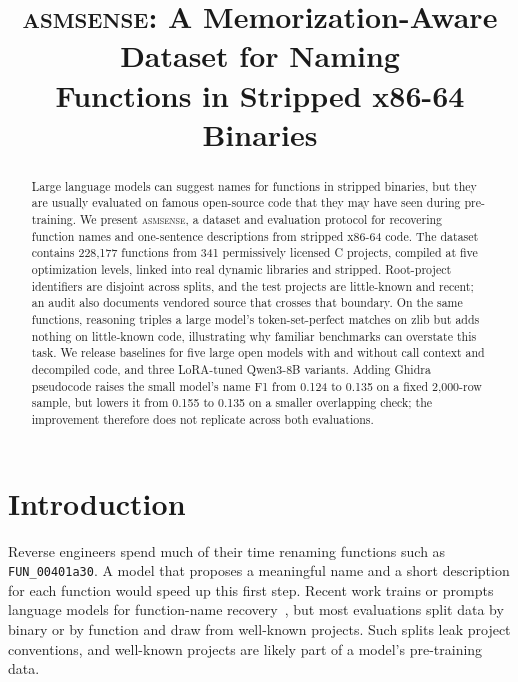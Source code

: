 \documentclass[conference]{IEEEtran}
\newcommand{\tool}{\textsc{asmsense}\xspace}
\begin{document}
\title{\tool: A Memorization-Aware Dataset for Naming\\Functions in Stripped x86-64 Binaries}

\author{
}

\maketitle

\begin{abstract}
Large language models can suggest names for functions in stripped binaries, but they are usually evaluated on famous open-source code that they may have seen during pre-training. We present \tool, a dataset and evaluation protocol for recovering function names and one-sentence descriptions from stripped x86-64 code. The dataset contains 228,177 functions from 341 permissively licensed C projects, compiled at five optimization levels, linked into real dynamic libraries and stripped. Root-project identifiers are disjoint across splits, and the test projects are little-known and recent; an audit also documents vendored source that crosses that boundary. On the same functions, reasoning triples a large model's token-set-perfect matches on zlib but adds nothing on little-known code, illustrating why familiar benchmarks can overstate this task. We release baselines for five large open models with and without call context and decompiled code, and three LoRA-tuned Qwen3-8B variants. Adding Ghidra pseudocode raises the small model's name F1 from 0.124 to 0.135 on a fixed 2,000-row sample, but lowers it from 0.155 to 0.135 on a smaller overlapping check; the improvement therefore does not replicate across both evaluations.
\end{abstract}

\section{Introduction}
Reverse engineers spend much of their time renaming functions such as \texttt{FUN\_00401a30}. A model that proposes a meaningful name and a short description for each function would speed up this first step. Recent work trains or prompts language models for function-name recovery~\cite{symlm,xfl,nero,llm4decompile}, but most evaluations split data by binary or by function and draw from well-known projects. Such splits leak project conventions, and well-known projects are likely part of a model's pre-training data.
\end{document}

